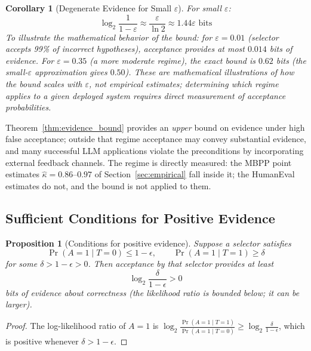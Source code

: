 \documentclass[a4paper,journal]{IAENGtran}
\newtheorem{Proposition}[Theorem]{Proposition}
\newtheorem{Corollary}[Theorem]{Corollary}
\begin{document}
\begin{Corollary}[Degenerate Evidence for Small $\varepsilon$]
For small $\varepsilon$:
\begin{equation}
\log_2 \frac{1}{1 - \varepsilon} \approx \frac{\varepsilon}{\ln 2} \approx 1.44\varepsilon
\text{ bits}
\end{equation}
To illustrate the mathematical behavior of the bound: for $\varepsilon = 0.01$ (selector
accepts 99\% of incorrect hypotheses), acceptance provides at most $0.014$ bits of evidence.
For $\varepsilon = 0.35$ (a more moderate regime), the exact bound is $0.62$ bits
(the small-$\varepsilon$ approximation gives $0.50$). These are mathematical illustrations of how the bound scales with $\varepsilon$, not
empirical estimates; determining which regime applies to a given deployed system requires
direct measurement of acceptance probabilities.
\end{Corollary}

Theorem~\ref{thm:evidence_bound} provides an \emph{upper} bound on evidence under high
false acceptance; outside that regime acceptance may convey substantial evidence, and
many successful LLM applications violate the preconditions by incorporating external
feedback channels. The regime is directly measured: the MBPP point estimates
$\hat\kappa=0.86$--$0.97$ of Section~\ref{sec:empirical} fall inside it; the HumanEval
estimates do not, and the bound is not applied to them.

\subsection{Sufficient Conditions for Positive Evidence}

\begin{Proposition}[Conditions for positive evidence]
\label{prop:multi_agent}
Suppose a selector satisfies
\begin{equation*}
\Pr(A = 1 \mid T = 0) \leq 1 - \epsilon,\qquad
\Pr(A = 1 \mid T = 1) \geq \delta
\end{equation*}
for some $\delta > 1 - \epsilon > 0$. Then acceptance by that selector provides at
least
\begin{equation}
\log_2 \frac{\delta}{1 - \epsilon} > 0
\end{equation}
bits of evidence about correctness (the likelihood ratio is bounded below; it can be
larger).
\end{Proposition}

\begin{proof}
The log-likelihood ratio of $A=1$ is
$\log_2 \frac{\Pr(A=1 \mid T=1)}{\Pr(A=1 \mid T=0)} \geq \log_2 \frac{\delta}{1-\epsilon}$,
which is positive whenever $\delta > 1 - \epsilon$. 
\end{proof}
\end{document}
